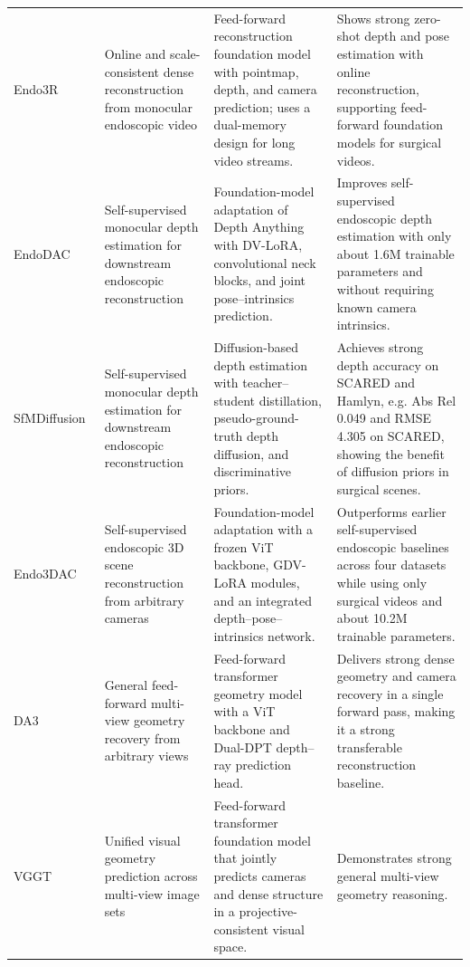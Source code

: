 \begin{footnotesize}
\begin{longtable}{>{\raggedright\arraybackslash}p{}>{\raggedright\arraybackslash}p{}>{\raggedright\arraybackslash}p{}>{\raggedright\arraybackslash}p{}}
    \multicolumn{4}{c}{\textbf{Dense 3D Reconstruction}} \\
    \midrule
    Endo3R ~\cite{endo3r2025} & Online and scale-consistent dense reconstruction from monocular endoscopic video & Feed-forward reconstruction foundation model with pointmap, depth, and camera prediction; uses a dual-memory design for long video streams. & Shows strong zero-shot depth and pose estimation with online reconstruction, supporting feed-forward foundation models for surgical videos. \\
    \addlinespace
    EndoDAC ~\cite{endodac2024} & Self-supervised monocular depth estimation for downstream endoscopic reconstruction & Foundation-model adaptation of Depth Anything with DV-LoRA, convolutional neck blocks, and joint pose--intrinsics prediction. & Improves self-supervised endoscopic depth estimation with only about 1.6M trainable parameters and without requiring known camera intrinsics. \\
    \addlinespace
    SfMDiffusion~\cite{sfmdiffusion2025} & Self-supervised monocular depth estimation for downstream endoscopic reconstruction & Diffusion-based depth estimation with teacher--student distillation, pseudo-ground-truth depth diffusion, and discriminative priors. & Achieves strong depth accuracy on SCARED and Hamlyn, e.g. Abs Rel 0.049 and RMSE 4.305 on SCARED, showing the benefit of diffusion priors in surgical scenes. \\
    \addlinespace
    Endo3DAC~\cite{endo3dac2025} & Self-supervised endoscopic 3D scene reconstruction from arbitrary cameras & Foundation-model adaptation with a frozen ViT backbone, GDV-LoRA modules, and an integrated depth--pose--intrinsics network. & Outperforms earlier self-supervised endoscopic baselines across four datasets while using only surgical videos and about 10.2M trainable parameters. \\
    \addlinespace
    DA3~\cite{lin2025da3} & General feed-forward multi-view geometry recovery from arbitrary views & Feed-forward transformer geometry model with a ViT backbone and Dual-DPT depth--ray prediction head. & Delivers strong dense geometry and camera recovery in a single forward pass, making it a strong transferable reconstruction baseline. \\
    \addlinespace
    VGGT~\cite{wang2025vggt} & Unified visual geometry prediction across multi-view image sets & Feed-forward transformer foundation model that jointly predicts cameras and dense structure in a projective-consistent visual space. & Demonstrates strong general multi-view geometry reasoning. \\

\end{longtable}
\end{footnotesize}
